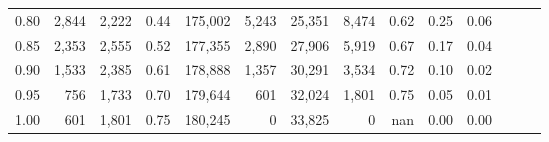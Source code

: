 \begin{tabular}{rrrrrrrrrrrrrr}
0.80 &   2,844 &  2,222 &  0.44 &  175,002 &    5,243 &  25,351 &   8,474 &  0.62 &  0.25 &      0.06 \\
0.85 &   2,353 &  2,555 &  0.52 &  177,355 &    2,890 &  27,906 &   5,919 &  0.67 &  0.17 &      0.04 \\
0.90 &   1,533 &  2,385 &  0.61 &  178,888 &    1,357 &  30,291 &   3,534 &  0.72 &  0.10 &      0.02 \\
0.95 &     756 &  1,733 &  0.70 &  179,644 &      601 &  32,024 &   1,801 &  0.75 &  0.05 &      0.01 \\
1.00 &     601 &  1,801 &  0.75 &  180,245 &        0 &  33,825 &       0 &   nan &  0.00 &      0.00 \\
\bottomrule
\end{tabular}
